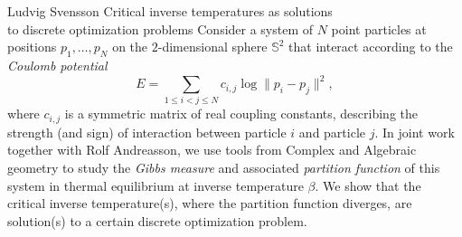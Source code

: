 \talk
{%
    Ludvig Svensson
}
{%
    Critical inverse temperatures as solutions\\to discrete optimization problems
}
{%
    Consider a system of $N$ point particles at positions
    $p_1, \dots, p_N$ on the $2$-dimensional sphere $\mathbb{S}^2$
    that interact according to the \emph{Coulomb potential}
    \[
        E = \sum_{1\leq i<j\leq N}c_{i,j}\log\|p_i - p_j\|^2,
    \]
    where $c_{i,j}$ is a symmetric matrix of real coupling constants,
    describing the strength (and sign) of interaction between
    particle $i$ and particle $j$.
    In joint work together with Rolf Andreasson, we use tools from
    Complex and Algebraic geometry to study the
    \emph{Gibbs measure} and associated
    \emph{partition function} of this system in thermal
    equilibrium at inverse temperature $\beta$. We show that the
    critical inverse temperature(s), where the partition function
    diverges, are solution(s) to a certain discrete optimization
    problem.
}
